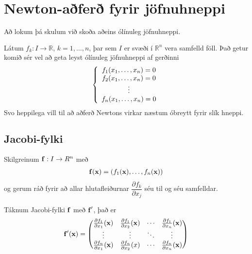 \documentclass[letterpaper,10pt,icelandic]{sphinxmanual}
\begin{document}

\section{Newton-aðferð fyrir jöfnuhneppi}
\label{kafli08:index-25}\label{kafli08:newton-afer-fyrir-jofnuhneppi}
Að lokum þá skulum við skoða aðeins ólínuleg jöfnuhneppi.

Látum \(f_k : I \to {\mathbb  R}\), \(k = 1, \ldots, n\), þar
sem \(I\) er svæði í \({\mathbb  R}^n\) vera samfelld föll. Það
getur komið sér vel að geta leyst ólínuleg jöfnuhneppi af gerðinni
\begin{gather}
\begin{split}\left\{ \begin{array}{c}
        f_1(x_1, \ldots, x_n) = 0 \\
        f_2(x_1, \ldots, x_n) = 0 \\
        \vdots \\
        f_n(x_1, \ldots, x_n) = 0 \\
    \end{array} \right.\end{split}\notag
\end{gather}
Svo heppilega vill til að aðferð Newtons virkar næstum óbreytt fyrir
slík hneppi.


\subsection{Jacobi-fylki}
\label{kafli08:index-26}\label{kafli08:jacobi-fylki}
Skilgreinum \(\mbox{${\bf f}$}: I \to R^n\) með
\begin{gather}
\begin{split}\mbox{${\bf f}$}(\mbox{${\bf x}$}) = \left(f_1(\mbox{${\bf x}$}),\ldots,f_n(\mbox{${\bf x}$})\right)\end{split}\notag
\end{gather}
og gerum ráð fyrir að allar hlutafleiðurnar \(\dfrac{\partial f_k}{\partial x_j}\) séu til og séu samfelldar.

Táknum Jacobi-fylki \(\mbox{${\bf f}$}\) með
\(\mbox{${\bf f}$}'\), það er
\begin{gather}
\begin{split}\mbox{${\bf f}$}'(\mbox{${\bf x}$}) = \begin{pmatrix}
        \frac{\partial f_1}{\partial x_1}(\mbox{${\bf x}$})
        & \frac{\partial f_1}{\partial x_2}(\mbox{${\bf x}$})
        & \cdots
        & \frac{\partial f_1}{\partial x_n}(\mbox{${\bf x}$}) \\
        \vdots & \vdots & \ddots & \vdots \\
        \frac{\partial f_n}{\partial x_1}(\mbox{${\bf x}$})
        & \frac{\partial f_n}{\partial x_2}(x)
        & \cdots
        & \frac{\partial f_n}{\partial x_n}(\mbox{${\bf x}$})
    \end{pmatrix}\end{split}\notag
\end{gather}
\end{document}
